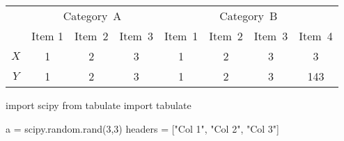 \begin{tabular}{c@{\qquad}ccc@{\qquad}cccc}
	\toprule
	\multirow{2}{*}{\raisebox{-\heavyrulewidth}{Title}} & \multicolumn{3}{c}{Category~A} & \multicolumn{4}{c}{Category~B} \\
	\cmidrule{2-8}
	& Item 1 & Item~2 & Item~3 & Item~1 & Item~2 & Item~3 & Item~4 \\
	\midrule
	$X$ & 1 & 2 & 3 & 1 & 2 & 3 & 3 \\
	$Y$ & 1 & 2 & 3 & 1 & 2 & 3 & 143 \\
	\bottomrule
\end{tabular}

\begin{pycode} 
	import scipy
	from tabulate import tabulate
	
	a = scipy.random.rand(3,3)
	headers = ["Col 1", "Col 2", "Col 3"]
\end{pycode}

\begin{table}[H]
\begin{center}
\end{center}
\end{table}
	
\begin{table}[H]
\centering
{}
\end{table}


